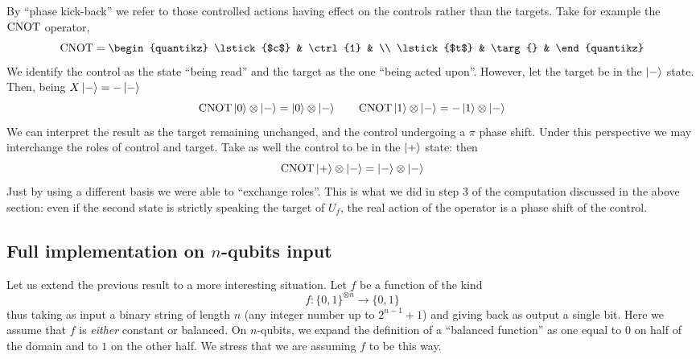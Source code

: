 By ``phase kick-back'' we refer to those controlled actions having effect on the controls rather than the targets. Take for example the $\operatorname{CNOT}$ operator,
\[
    \cnot = \begin{quantikz}
        \lstick{$c$} & \ctrl{1} & \\
        \lstick{$t$} & \targ{} &
    \end{quantikz}
\]
We identify the control as the state ``being read'' and the target as the one ``being acted upon''. However, let the target be in the $\ket{-}$ state. Then, being $X\ket{-} = -\ket{-}$
\[
    \operatorname{CNOT} \ket{0} \otimes \ket{-} = \ket{0} \otimes \ket{-}
    \qquad
    \operatorname{CNOT} \ket{1} \otimes \ket{-} = - \ket{1} \otimes \ket{-}
\]
We can interpret the result as the target remaining unchanged, and the control undergoing a $\pi$ phase shift. Under this perspective we may interchange the roles of control and target. Take as well the control to be in the $\ket{+}$ state: then
\[
    \operatorname{CNOT} \ket{+} \otimes \ket{-} = \ket{-} \otimes \ket{-}
\]
Just by using a different basis we were able to ``exchange roles''. This is what we did in step 3 of the computation discussed in the above section: even if the second state is strictly speaking the target of $U_f$, the real action of the operator is a phase shift of the control.

\subsection{Full implementation on $n$-qubits input}

Let us extend the previous result to a more interesting situation. Let $f$ be a function of the kind
\[
    f \colon \lbrace 0,1 \rbrace^{\otimes n} \to \lbrace 0,1 \rbrace
\]
thus taking as input a binary string of length $n$ (any integer number up to $2^{n-1}+1$) and giving back as output a single bit. Here we assume that $f$ is \textit{either} constant or balanced. On $n$-qubits, we expand the definition of a ``balanced function'' as one equal to $0$ on half of the domain and to $1$ on the other half. We stress that we are assuming $f$ to be this way. 

